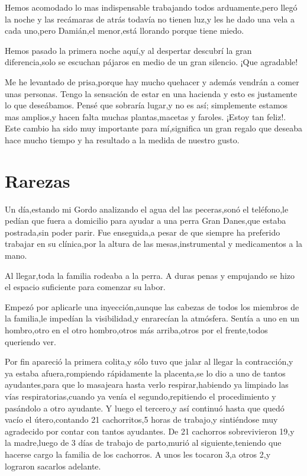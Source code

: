 \documentclass[letterpaper,12pt]{book}
\begin{document}
Hemos acomodado lo mas indispensable trabajando todos arduamente,pero llegó la noche y las recámaras de atrás todavía no tienen luz,y les he dado una vela a cada uno,pero Damián,el menor,está llorando porque tiene miedo.

Hemos pasado la primera noche aquí,y al despertar descubrí la gran diferencia,solo se escuchan pájaros en medio de un gran silencio. ¡Que agradable!

Me he levantado de prisa,porque hay mucho quehacer y además vendrán a comer unas personas. Tengo la sensación de estar en una hacienda y esto es justamente lo que deseábamos. Pensé que sobraría lugar,y no es así; simplemente estamos mas amplios,y hacen falta muchas plantas,macetas y faroles. ¡Estoy tan feliz!. Este cambio ha sido muy importante para mí,significa un gran regalo que deseaba hace mucho tiempo y ha resultado a la medida de nuestro gusto.

\chapter{Rarezas}
Un día,estando mi Gordo analizando el agua del las peceras,sonó el teléfono,le pedían que fuera a domicilio para ayudar a una perra Gran Danes,que estaba postrada,sin poder parir. Fue enseguida,a pesar de que siempre ha preferido trabajar en su clínica,por la altura de las mesas,instrumental y medicamentos a la mano.

Al llegar,toda la familia rodeaba a la perra. A duras penas y empujando se hizo el espacio suficiente para comenzar su labor.

Empezó por aplicarle una inyección,aunque las cabezas de todos los miembros de la familia,le impedían la visibilidad,y enrarecían la atmósfera. Sentía a uno en un hombro,otro en el otro hombro,otros más arriba,otros por el frente,todos queriendo ver.

Por fin apareció la primera colita,y sólo tuvo que jalar al llegar la contracción,y ya estaba afuera,rompiendo rápidamente la placenta,se lo dio a uno de tantos ayudantes,para que lo masajeara hasta verlo respirar,habiendo ya limpiado las vías respiratorias,cuando ya venía el segundo,repitiendo el procedimiento y pasándolo a otro ayudante. Y luego el tercero,y así continuó hasta que quedó vacío el útero,contando 21 cachorritos,5 horas de trabajo,y sintiéndose muy agradecido por contar con tantos ayudantes. De 21 cachorros sobrevivieron 19,y la madre,luego de 3 días de trabajo de parto,murió al siguiente,teniendo que hacerse cargo la familia de los cachorros. A unos les tocaron 3,a otros 2,y lograron sacarlos adelante.
\end{document}
